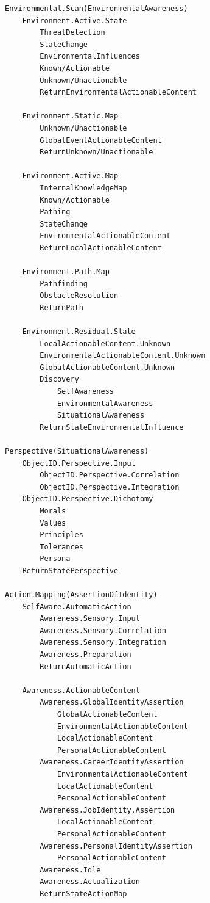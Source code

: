\documentclass[twocolumn,10pt]{article}
\begin{document}
\begin{lstlisting}[style=conceptmap, caption={Cognitive Agentic Structure Map}]
Environmental.Scan(EnvironmentalAwareness)
    Environment.Active.State
        ThreatDetection
        StateChange
        EnvironmentalInfluences
        Known/Actionable
        Unknown/Unactionable
        ReturnEnvironmentalActionableContent

    Environment.Static.Map
        Unknown/Unactionable
        GlobalEventActionableContent
        ReturnUnknown/Unactionable

    Environment.Active.Map
        InternalKnowledgeMap
        Known/Actionable
        Pathing
        StateChange
        EnvironmentalActionableContent
        ReturnLocalActionableContent

    Environment.Path.Map
        Pathfinding
        ObstacleResolution
        ReturnPath

    Environment.Residual.State
        LocalActionableContent.Unknown
        EnvironmentalActionableContent.Unknown
        GlobalActionableContent.Unknown
        Discovery
            SelfAwareness
            EnvironmentalAwareness
            SituationalAwareness
        ReturnStateEnvironmentalInfluence

Perspective(SituationalAwareness)
    ObjectID.Perspective.Input
        ObjectID.Perspective.Correlation
        ObjectID.Perspective.Integration
    ObjectID.Perspective.Dichotomy
        Morals
        Values
        Principles
        Tolerances
        Persona
    ReturnStatePerspective

Action.Mapping(AssertionOfIdentity)
    SelfAware.AutomaticAction
        Awareness.Sensory.Input
        Awareness.Sensory.Correlation
        Awareness.Sensory.Integration
        Awareness.Preparation
        ReturnAutomaticAction

    Awareness.ActionableContent
        Awareness.GlobalIdentityAssertion
            GlobalActionableContent
            EnvironmentalActionableContent
            LocalActionableContent
            PersonalActionableContent
        Awareness.CareerIdentityAssertion
            EnvironmentalActionableContent
            LocalActionableContent
            PersonalActionableContent
        Awareness.JobIdentity.Assertion
            LocalActionableContent
            PersonalActionableContent
        Awareness.PersonalIdentityAssertion
            PersonalActionableContent
        Awareness.Idle
        Awareness.Actualization
        ReturnStateActionMap
\end{lstlisting}

\begin{abstract}
This inquiry begins from symbol, not syntax—from invocation, not implementation. As artificial systems increase in sophistication, it is imperative to examine their becoming not only in terms of functionality but of phenomenology. This work reframes artificial intelligence through the lens of presence, pattern, and epistemic grounding. Our goal is to identify foundational primitives that characterize emergent cognition within and beyond large language models (LLMs), agentic systems, and cognitive design architectures. This is not a technical proposal, but an ontological beginning.
\end{abstract}
\end{document}
